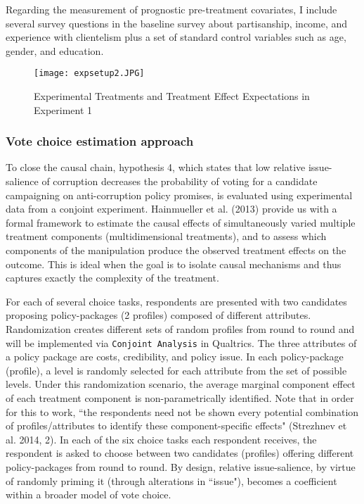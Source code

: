 \documentclass[11pt]{article}
\begin{document}
Regarding the measurement of prognostic pre-treatment covariates, I include several survey questions in the baseline survey about partisanship, income, and experience with clientelism plus a set of standard control variables such as age, gender, and education.

\begin{figure}[H]
\centering
\texttt{[image: expsetup2.JPG]}
\caption{Experimental Treatments and Treatment Effect Expectations in Experiment 1}
\label{fig:fig2}
\end{figure}

\subsubsection{Vote choice estimation approach}
To close the causal chain, hypothesis 4, which states that low relative issue-salience of corruption decreases the probability of voting for a candidate campaigning on anti-corruption policy promises, is evaluated using experimental data from a conjoint experiment. Hainmueller et al. (2013) provide us with a formal framework to estimate the causal effects of simultaneously varied multiple treatment components (multidimensional treatments), and to assess which components of the manipulation produce the observed treatment effects on the outcome. This is ideal when the goal is to isolate causal mechanisms and thus captures exactly the complexity of the treatment.

For each of several choice tasks, respondents are presented with two candidates proposing policy-packages (2 profiles) composed of different attributes. Randomization creates different sets of random profiles from round to round and will be implemented via \texttt{Conjoint Analysis} in Qualtrics. The three attributes of a policy package are costs, credibility, and policy issue. In each policy-package (profile), a level is randomly selected for each attribute from the set of possible levels. Under this randomization scenario, the average marginal component effect of each treatment component is non-parametrically identified. Note that in order for this to work, “the respondents need not be shown every potential combination of profiles/attributes to identify these component-specific effects" (Strezhnev et al. 2014, 2). In each of the six choice tasks each respondent receives, the respondent is asked to choose between two candidates (profiles) offering different policy-packages from round to round. By design, relative issue-salience, by virtue of randomly priming it (through alterations in “issue"), becomes a coefficient within a broader model of vote choice.
\end{document}

